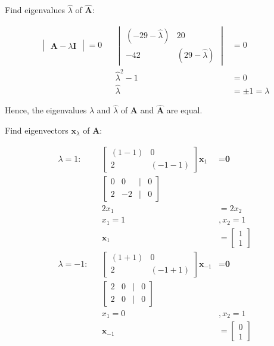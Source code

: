 \documentclass{article}
\begin{document}
Find eigenvalues $\hat{\lambda}$ of $\hat{\textbf{A}}$:

\begin{align}
    \label{eq:12}
    \begin{vmatrix}
    \textbf{A} - \lambda\textbf{I}
    \end{vmatrix} = 0 && \begin{vmatrix}
    (-29-\hat\lambda) & 20 \\
    -42 & (29 - \hat\lambda)
    \end{vmatrix} &= 0
    \\
    \label{eq:13}
    && \hat\lambda^2 -1 &= 0
    \\
    \label{eq:14}
    && \hat\lambda &= \pm 1 = \lambda
\end{align}

Hence, the eigenvalues $\lambda$ and $\hat\lambda$ of \textbf{A} and $\hat{\textbf{A}}$ are equal.  

Find eigenvectors $\textbf{x}_\lambda$ of \textbf{A}:

\begin{align}
    \label{eq:15}
    \lambda = 1: && \begin{bmatrix}
    (1-1) & 0\\
    2 & (-1-1)
    \end{bmatrix} \textbf{x}_1 &= \textbf{0}
    \\
    \label{eq:16}
    && \begin{bmatrix}
    0 & 0 &|& 0\\
    2 & -2 &|& 0
    \end{bmatrix}
    \\
    \label{eq:17}
    && 2x_1 &= 2x_2
    \\
    \label{eq:18}
    && x_1 =1 &, x_2 = 1
    \\
    \label{eq:19}
    && \textbf{x}_1 &= \begin{bmatrix}
    1\\1
    \end{bmatrix}
    \\
    \label{eq:20}
    \lambda = -1: && \begin{bmatrix}
    (1+1) & 0\\
    2 & (-1+1)
    \end{bmatrix} \textbf{x}_{-1} &= \textbf{0}
    \\
    \label{eq:21}
    &&\begin{bmatrix}
    2&0&|&0\\
    2&0&|&0
    \end{bmatrix}
    \\
    \label{eq:22}
    && x_1 = 0 &, x_2 = 1
    \\
    \label{eq:23}
    && \textbf{x}_{-1} &= \begin{bmatrix}
    0\\1
    \end{bmatrix}
\end{align}
\end{document}
